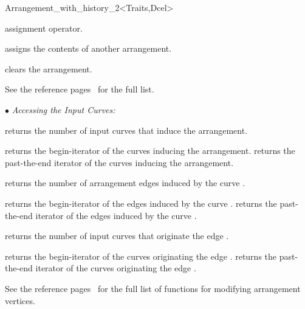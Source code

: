 \begin{ccRefClass}{Arrangement_with_history_2<Traits,Dcel>}

    {assignment operator.}

    {assigns the contents of another arrangement.}

    {clears the arrangement.}


\ccAccessFunctions

See the  reference 
pages~ for the full list.


$\bullet$ {\sl Accessing the Input Curves:}

    {returns the number of input curves that induce the arrangement.}

    {returns the begin-iterator of the curves inducing the arrangement.}
\ccGlue    
{}
    {returns the past-the-end iterator of the curves inducing the arrangement.}

    {returns the number of arrangement edges induced by the curve .}

    {returns the begin-iterator of the edges induced by the curve .}
\ccGlue
{}
    {returns the past-the-end iterator of the edges induced by the curve .}
    
    {returns the number of input curves that originate the edge .}

    {returns the begin-iterator of the curves originating the edge .}
\ccGlue
{}
    {returns the past-the-end iterator  of the curves originating the edge 
     .}
    
\ccModifiers

See the  reference
pages~ for the full
list of functions for modifying arrangement vertices.


\end{ccRefClass}
